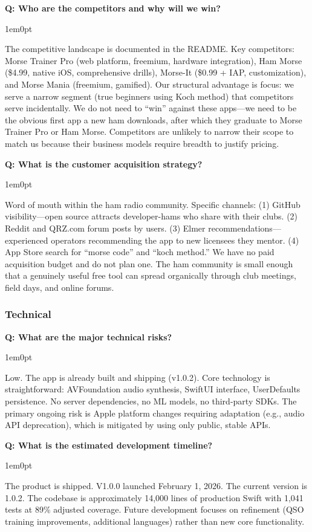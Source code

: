 \documentclass[11pt,letterpaper]{article}
\newenvironment{faqpair}[1]{%
  \vspace{0.5em}%
  \noindent\textbf{\color{SectionBlue}Q: #1}\par%
  \vspace{0.2em}%
  \begin{adjustwidth}{1em}{0pt}%
  \setlength{\parindent}{0pt}%
}{%
  \end{adjustwidth}%
  \vspace{0.5em}%
}
\begin{document}
\begin{faqpair}{Who are the competitors and why will we win?}
  The competitive landscape is documented in the README. Key competitors: Morse Trainer Pro (web platform, freemium, hardware integration), Ham Morse (\$4.99, native iOS, comprehensive drills), Morse-It (\$0.99 + IAP, customization), and Morse Mania (freemium, gamified). Our structural advantage is focus: we serve a narrow segment (true beginners using Koch method) that competitors serve incidentally. We do not need to ``win'' against these apps---we need to be the obvious first app a new ham downloads, after which they graduate to Morse Trainer Pro or Ham Morse. Competitors are unlikely to narrow their scope to match us because their business models require breadth to justify pricing.
\end{faqpair}

\begin{faqpair}{What is the customer acquisition strategy?}
  Word of mouth within the ham radio community. Specific channels: (1) GitHub visibility---open source attracts developer-hams who share with their clubs. (2) Reddit and QRZ.com forum posts by users. (3) Elmer recommendations---experienced operators recommending the app to new licensees they mentor. (4) App Store search for ``morse code'' and ``koch method.'' We have no paid acquisition budget and do not plan one. The ham community is small enough that a genuinely useful free tool can spread organically through club meetings, field days, and online forums.
\end{faqpair}

\subsubsection*{Technical}

\begin{faqpair}{What are the major technical risks?}
  Low. The app is already built and shipping (v1.0.2). Core technology is straightforward: AVFoundation audio synthesis, SwiftUI interface, UserDefaults persistence. No server dependencies, no ML models, no third-party SDKs. The primary ongoing risk is Apple platform changes requiring adaptation (e.g., audio API deprecation), which is mitigated by using only public, stable APIs.
\end{faqpair}

\begin{faqpair}{What is the estimated development timeline?}
  The product is shipped. V1.0.0 launched February 1, 2026. The current version is 1.0.2. The codebase is approximately 14,000 lines of production Swift with 1,041 tests at 89\% adjusted coverage. Future development focuses on refinement (QSO training improvements, additional languages) rather than new core functionality.
\end{faqpair}
\end{document}
